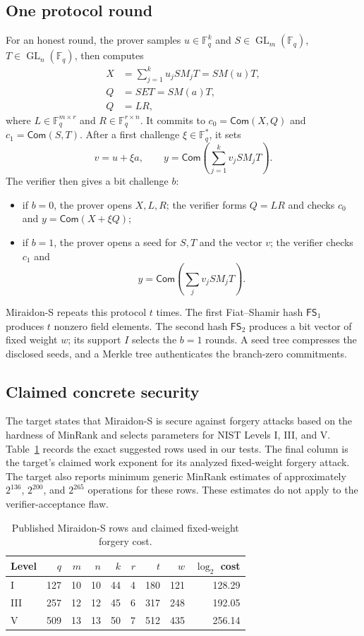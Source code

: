 \documentclass[10pt,a4paper]{article}
\newcommand{\F}{\mathbb{F}}
\newcommand{\Com}{\mathsf{Com}}
\newcommand{\FSone}{\mathsf{FS}_1}
\newcommand{\FStwo}{\mathsf{FS}_2}
\newcommand{\GL}{\operatorname{GL}}
\begin{document}
\subsection{One protocol round}

For an honest round, the prover samples $u\in\F_q^k$ and
$S\in\GL_m(\F_q)$, $T\in\GL_n(\F_q)$, then computes
\begin{align*}
  X &= \sum_{j=1}^{k}u_jSM_jT = S M(u)T,\\
  Q &= SET = S M(a)T,\\
  Q &= LR,
\end{align*}
where $L\in\F_q^{m\times r}$ and $R\in\F_q^{r\times n}$.  It commits to
$c_0=\Com(X,Q)$ and $c_1=\Com(S,T)$.  After a first challenge
$\xi\in\F_q^*$, it sets
\[
  v=u+\xi a,
  \qquad
  y=\Com\!\left(\sum_{j=1}^{k}v_jSM_jT\right).
\]
The verifier then gives a bit challenge $b$:
\begin{itemize}
  \item if $b=0$, the prover opens $X,L,R$; the verifier forms $Q=LR$ and
  checks $c_0$ and $y=\Com(X+\xi Q)$;
  \item if $b=1$, the prover opens a seed for $S,T$ and the vector $v$; the
  verifier checks $c_1$ and
  \[
    y=\Com\!\left(\sum_jv_jSM_jT\right).
  \]
\end{itemize}
Miraidon-S repeats this protocol $t$ times.  The first Fiat--Shamir hash
$\FSone$ produces $t$ nonzero field elements.  The second hash $\FStwo$
produces a bit vector of fixed weight $w$; its support $I$ selects the
$b=1$ rounds.  A seed tree compresses the disclosed seeds, and a Merkle tree
authenticates the branch-zero commitments.

\subsection{Claimed concrete security}

The target states that Miraidon-S is secure against forgery attacks based on
the hardness of MinRank and selects parameters for NIST Levels I, III, and V.
Table~\ref{tab:claimed} records the exact suggested rows used in our tests.
The final column is the target's claimed work exponent for its analyzed
fixed-weight forgery attack.  The target also reports minimum generic MinRank
estimates of approximately $2^{136}$, $2^{200}$, and $2^{265}$ operations for
these rows.  These estimates do not apply to the verifier-acceptance flaw.

\begin{table}[ht]
\centering
\caption{Published Miraidon-S rows and claimed fixed-weight forgery cost.}
\label{tab:claimed}
\small
\begin{tabular}{@{}lrrrrrrrr@{}}
\toprule
Level & $q$ & $m$ & $n$ & $k$ & $r$ & $t$ & $w$ & $\log_2$ cost \\
\midrule
I   & 127 & 10 & 10 & 44 & 4 & 180 & 121 & 128.29 \\
III & 257 & 12 & 12 & 45 & 6 & 317 & 248 & 192.05 \\
V   & 509 & 13 & 13 & 50 & 7 & 512 & 435 & 256.14 \\
\bottomrule
\end{tabular}
\end{table}
\end{document}
